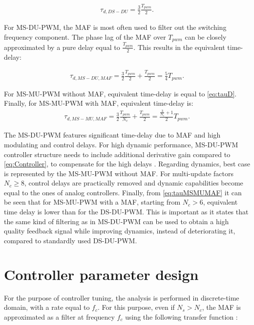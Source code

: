 \documentclass[conference]{IEEEtran}
\begin{document}
\begin{equation}
\begin{aligned}
\tau_{d,DS-DU} = \frac{3}{2} \frac{T_{pwm}}{2}.
\label{eq:tauDSDU} 
\end{aligned}    
\end{equation}

For MS-DU-PWM, the MAF is most often used to filter out the switching frequency component. The phase lag of the MAF over $T_{pwm}$ can be closely approximated by a pure delay equal to $\frac{T_{pwm}}{2}$. This results in the equivalent time-delay:

\begin{equation}
\begin{aligned}
\tau_{d,MS-DU,MAF} = \frac{3}{2} \frac{T_{pwm}}{2} + \frac{T_{pwm}}{2} = \frac{5}{4} T_{pwm}.
\label{eq:tauMSDU} 
\end{aligned}    
\end{equation}

For MS-MU-PWM without MAF, equivalent time-delay is equal to \eqref{eq:tauD}.
Finally, for MS-MU-PWM with MAF, equivalent time-delay is:
\begin{equation}
\begin{aligned}
\tau_{d,MS-MU,MAF} = \frac{3}{2} \frac{T_{pwm}}{N_c} + \frac{T_{pwm}}{2} = \frac{\frac{3}{N_c}+1}{2}T_{pwm}.
\label{eq:tauMSMUMAF} 
\end{aligned}    
\end{equation}

The MS-DU-PWM features significant time-delay due to MAF and high modulating and control delays. For high dynamic performance, MS-DU-PWM controller structure needs to include additional derivative gain compared to \eqref{eq:Controller}, to compensate for the high delays \cite{vuksa2016}. Regarding dynamics, best case is represented by the MS-MU-PWM without MAF. For multi-update factors $N_c \geq 8$, control delays are practically removed and dynamic capabilities become equal to the ones of analog controllers.
Finally, from \eqref{eq:tauMSMUMAF} it can be seen that for MS-MU-PWM with a MAF, starting from $N_c>6$, equivalent time delay is lower than for the DS-DU-PWM. This is important as it states that the same kind of filtering as in MS-DU-PWM can be used to obtain a high quality feedback signal while improving dynamics, instead of deteriorating it, compared to standardly used DS-DU-PWM.

\section{Controller parameter design}
For the purpose of controller tuning, the analysis is performed in discrete-time domain, with a rate equal to $f_c$. For this purpose, even if $N_s > N_c$, the MAF is approximated as a filter at frequency $f_c$ using the following transfer function \cite{vuksa2016}:
\end{document}
